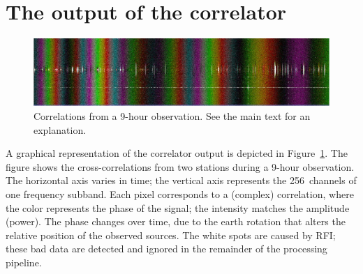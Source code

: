 \documentclass{sig-alternate}
\begin{document}




%
\section{The output of the correlator}

\begin{figure}[ht]
\includegraphics[width=\columnwidth]{fringe.jpg}
\caption{Correlations from a 9-hour observation.  See the main text for
an explanation.}
\label{fig:fringe}
\end{figure}

A graphical representation of the correlator output is depicted in
Figure~\ref{fig:fringe}.
The figure shows the cross-correlations from two stations during a 9-hour
observation.
The horizontal axis varies in time;
the vertical axis represents the 256~channels of one frequency subband.
Each pixel corresponds to a (complex) correlation, where the color represents
the phase of the signal; the intensity matches the amplitude (power).
The phase changes over time, due to the earth rotation that alters the
relative position of the observed sources.
The white spots are caused by RFI; these bad data are detected and
ignored in the remainder of the processing pipeline.
\end{document}

